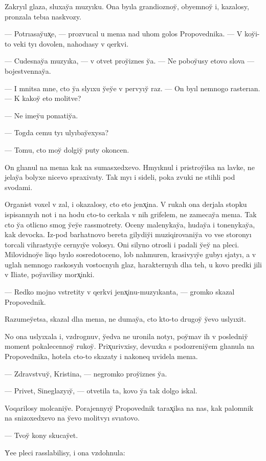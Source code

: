 \documentclass[10pt]{book}
\begin{document}
Zakryıl glaza, sluxay̆a muzyıku. Ona byıla grandioznoy̆, obyemnoy̆ i, kazalosy, pronzala tebıa naskvozy.

— Potrıasay̆ux̨e, — prozvucal u menıa nad uhom golos Propovednika. — V koy̆i-to veki tyı dovolen, nahodıasy v qerkvi.

— Cudesnay̆a muzyıka, — v otvet proy̆iznes y̆a. — Ne poboy̆usy etovo slova — bojestvennay̆a.

— I mnitsa mne, cto y̆a slyıxu y̆ey̆e v pervyıy̆ raz. — On byıl nemnogo rasterıan. — K kakoy̆ eto molitve?

— Ne imey̆u ponıatiy̆a.

— Togda cemu tyı ulyıbay̆exysa?

— Tomu, cto moy̆ dolgiy̆ puty okoncen.

On glıanul na menıa kak na sumasxedxevo. Hmyıknul i pristroy̆ilsa na lavke, ne jelay̆a bolyxe nicevo spraxivaty. Tak myı i sideli, poka zvuki ne stihli pod svodami.

Organist voxel v zal, i okazalosy, cto eto jenx̨ina. V rukah ona derjala stopku ispisannyıh not i na hodu cto-to cerkala v nih grifelem, ne zamecay̆a menıa. Tak cto y̆a otlicno smog y̆ey̆e rassmotrety. Oceny malenykay̆a, huday̆a i tonenykay̆a, kak devocka. Iz-pod barhatnovo bereta gilydiy̆i muziqirovaniy̆a vo vse storonyı torcali vihrastyıy̆e cernyıy̆e volosyı. Oni silyno otrosli i padali y̆ey̆ na pleci. Milovidnoy̆e liqo byılo sosredotoceno, lob nahmuren, krasivyıy̆e gubyı sjatyı, a v uglah nemnogo raskosyıh vostocnyıh glaz, harakternyıh dlıa teh, u kovo predki jili v Iliate, poy̆avilisy morx̨inki.

— Redko mojno vstretity v qerkvi jenx̨inu-muzyıkanta, — gromko skazal Propovednik.

Razumey̆etsa, skazal dlıa menıa, ne dumay̆a, cto kto-to drugoy̆ y̆evo uslyıxit.

No ona uslyıxala i, vzdrognuv, y̆edva ne uronila notyı, poy̆mav ih v posledniy̆ moment pokalecennoy̆ rukoy̆. Prix̨urivxisy, devuxka s podozreniy̆em glıanula na Propovednika, hotela cto-to skazaty i nakoneq uvidela menıa.

— Zdravstvuy̆, Kristina, — negromko proy̆iznes y̆a.

— Privet, Sineglazyıy̆, — otvetila ta, kovo y̆a tak dolgo iskal.

Voqarilosy molcaniy̆e. Porajennyıy̆ Propovednik tarax̨ilsa na nas, kak palomnik na snizoxedxevo na y̆evo molitvyı svıatovo.

— Tvoy̆ kony skucay̆et.

Y̆ee pleci rasslabilisy, i ona vzdohnula:
\end{document}
